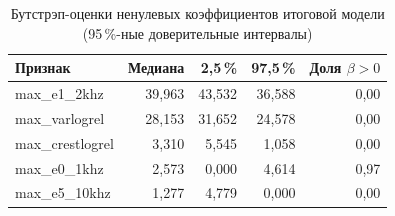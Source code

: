 \begin{table}[H]
\centering
\caption{Бутстрэп-оценки ненулевых коэффициентов итоговой модели (95\,\%-ные доверительные интервалы)}\label{tab:coef}
\begin{tabular}{p{5.6cm}rrrr}
\toprule
Признак & Медиана & 2,5\,\% & 97,5\,\% & Доля $\beta>0$ \\
\midrule
max\_e1\_2khz & \textminus{}39,963 & \textminus{}43,532 & \textminus{}36,588 & 0,00 \\
max\_varlogrel & \textminus{}28,153 & \textminus{}31,652 & \textminus{}24,578 & 0,00 \\
max\_crestlogrel & \textminus{}3,310 & \textminus{}5,545 & \textminus{}1,058 & 0,00 \\
max\_e0\_1khz & 2,573 & 0,000 & 4,614 & 0,97 \\
max\_e5\_10khz & \textminus{}1,277 & \textminus{}4,779 & 0,000 & 0,00 \\
\bottomrule
\end{tabular}
\end{table}